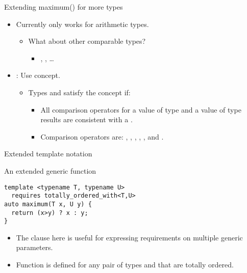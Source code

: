 \begin{frame}[t,fragile]{Extending maximum() for more types}
\begin{itemize}
  \item Currently  only works for arithmetic types.
    \begin{itemize}
      \item What about other comparable types?
        \begin{itemize}
          \item {}, , \ldots
        \end{itemize}
    \end{itemize}

  \item {}: Use  concept.
    \begin{itemize}
      \item Types  and  satisfy the  concept
            if:
        \begin{itemize}
          \item All comparison operators for a value  of type  and
                a value  of type  results are consistent 
                with a .
          \item Comparison operators are:
                \cppkey{==}, \cppkey{!=}, \cppkey{<}, \cppkey{<=}, \cppkey{>}, and \cppkey{>=}.
        \end{itemize}
    \end{itemize}

\end{itemize}
\end{frame}

\begin{frame}[t,fragile]{Extended template notation}
\begin{block}{An extended generic function}
\begin{lstlisting}
template <typename T, typename U>
  requires totally_ordered_with<T,U>
auto maximum(T x, U y) {
  return (x>y) ? x : y;
}
\end{lstlisting}
\end{block}

\begin{itemize}
  \item The  clause here is useful for expressing requirements on multiple
        generic parameters.

  \item Function  is defined for any pair of types  and 
        that are totally ordered.
\end{itemize}

\end{frame}

